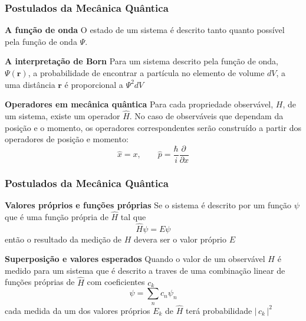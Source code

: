 \documentclass[12pt,brazil,table]{beamer}
\begin{document}
\begin{frame}
  \frametitle{Postulados da Mecânica Quântica}
  \fontsize{10pt}{11pt}\selectfont

  \textbf{A função de onda}\newline
    O estado de um sistema é descrito tanto quanto possível pela função de onda $\Psi$. \newline
  
  \textbf{A interpretação de Born}\newline
    Para um sistema descrito pela função de onda, $\Psi(\mathbf{r})$, a probabilidade de encontrar a partícula no elemento de volume $dV$, a uma distância $\mathbf{r}$ é proporcional a $\Psi^2 dV$
   \newline
  
  \textbf{Operadores em mecânica quântica}\newline
    Para cada propriedade observável, $H$, de um sistema, existe um operador $\hat{H}$. No caso de observáveis que dependam da posição e o momento, os operadores correspondentes serão construído a partir dos operadores de posição e momento:
    \[
     \hat{x} = x,\qquad \hat{p}=\dfrac{\hbar}{i}\dfrac{\partial\,}{\partial x}
    \]

  
\end{frame}


\begin{frame}
  \frametitle{Postulados da Mecânica Quântica}
  \fontsize{10pt}{11pt}\selectfont
  
  \textbf{Valores próprios e funções próprias}\newline
  Se o sistema é descrito por um função $\psi$ que é uma função própria de $\hat{H}$ tal que
  \[
   \hat{H}\psi = E\psi
  \]
  então o resultado da medição de $H$ devera ser o valor próprio $E$
   \newline

  \textbf{Superposição e valores esperados}\newline
  Quando o valor de um observável $H$ é medido para um sistema que é descrito a traves de uma combinação linear de funções próprias de $\hat{H}$  com coeficientes $c_k$
  \[
   \psi = \sum_n c_n\psi_n
  \]
  cada medida da um dos valores próprios $E_k$ de $\hat{H}$ terá probabilidade $\left| \, c_k  \, \right|^2$
\end{frame}
\end{document}
